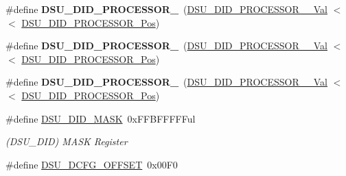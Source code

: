\begin{DoxyCompactItemize}
\item 
\hypertarget{group___s_a_m_l21___d_s_u_ga54d8a4c5a16fd004138fc90b8c42a6ae}{}\#define {\bfseries D\+S\+U\+\_\+\+D\+I\+D\+\_\+\+P\+R\+O\+C\+E\+S\+S\+O\+R\+\_}~(\hyperlink{group___s_a_m_l21___d_s_u_gac2f32025209af56842bfe0f9fc892b56}{D\+S\+U\+\_\+\+D\+I\+D\+\_\+\+P\+R\+O\+C\+E\+S\+S\+O\+R\+\_\+\_\+\+Val}       $<$$<$ \hyperlink{group___s_a_m_l21___d_s_u_gaf39e8c9b37c218a74228db9507493fa2}{D\+S\+U\+\_\+\+D\+I\+D\+\_\+\+P\+R\+O\+C\+E\+S\+S\+O\+R\+\_\+\+Pos})\label{group___s_a_m_l21___d_s_u_ga54d8a4c5a16fd004138fc90b8c42a6ae}

\item 
\hypertarget{group___s_a_m_l21___d_s_u_ga0a0e686c8a1e814ede8a99e934800732}{}\#define {\bfseries D\+S\+U\+\_\+\+D\+I\+D\+\_\+\+P\+R\+O\+C\+E\+S\+S\+O\+R\+\_}~(\hyperlink{group___s_a_m_l21___d_s_u_ga723c965c65022c1bf4315e59dfe3591c}{D\+S\+U\+\_\+\+D\+I\+D\+\_\+\+P\+R\+O\+C\+E\+S\+S\+O\+R\+\_\+\_\+\+Val}       $<$$<$ \hyperlink{group___s_a_m_l21___d_s_u_gaf39e8c9b37c218a74228db9507493fa2}{D\+S\+U\+\_\+\+D\+I\+D\+\_\+\+P\+R\+O\+C\+E\+S\+S\+O\+R\+\_\+\+Pos})\label{group___s_a_m_l21___d_s_u_ga0a0e686c8a1e814ede8a99e934800732}

\item 
\hypertarget{group___s_a_m_l21___d_s_u_gad454ff64fa3c806d3498956f879f1cea}{}\#define {\bfseries D\+S\+U\+\_\+\+D\+I\+D\+\_\+\+P\+R\+O\+C\+E\+S\+S\+O\+R\+\_}~(\hyperlink{group___s_a_m_l21___d_s_u_gaf13d713f6369fd6ddf23f9cc03e307c5}{D\+S\+U\+\_\+\+D\+I\+D\+\_\+\+P\+R\+O\+C\+E\+S\+S\+O\+R\+\_\+\_\+\+Val}       $<$$<$ \hyperlink{group___s_a_m_l21___d_s_u_gaf39e8c9b37c218a74228db9507493fa2}{D\+S\+U\+\_\+\+D\+I\+D\+\_\+\+P\+R\+O\+C\+E\+S\+S\+O\+R\+\_\+\+Pos})\label{group___s_a_m_l21___d_s_u_gad454ff64fa3c806d3498956f879f1cea}

\item 
\hypertarget{group___s_a_m_l21___d_s_u_gac1403dba443577379c24df9d1bff8cb1}{}\#define \hyperlink{group___s_a_m_l21___d_s_u_gac1403dba443577379c24df9d1bff8cb1}{D\+S\+U\+\_\+\+D\+I\+D\+\_\+\+M\+A\+S\+K}~0x\+F\+F\+B\+F\+F\+F\+F\+Ful\label{group___s_a_m_l21___d_s_u_gac1403dba443577379c24df9d1bff8cb1}

\begin{DoxyCompactList}\small\item\em (D\+S\+U\+\_\+\+D\+I\+D) M\+A\+S\+K Register \end{DoxyCompactList}\item 
\hypertarget{group___s_a_m_l21___d_s_u_ga9a4b5cb0b0da6a2c4a085b5f7b2a69e8}{}\#define \hyperlink{group___s_a_m_l21___d_s_u_ga9a4b5cb0b0da6a2c4a085b5f7b2a69e8}{D\+S\+U\+\_\+\+D\+C\+F\+G\+\_\+\+O\+F\+F\+S\+E\+T}~0x00\+F0\label{group___s_a_m_l21___d_s_u_ga9a4b5cb0b0da6a2c4a085b5f7b2a69e8}


\end{DoxyCompactItemize}
